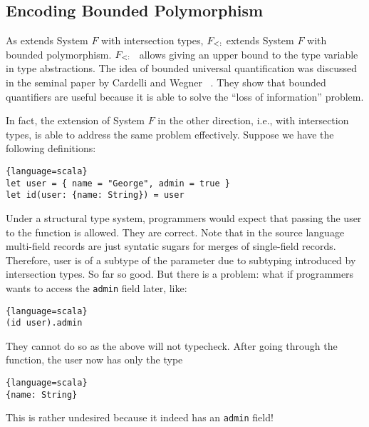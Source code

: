



\subsection{Encoding Bounded Polymorphism}

As \name extends System $ F $ with intersection types, $ F_{<:} $ extends
System $ F $ with bounded polymorphism. $ F_{<:} $~\cite{pierce2002types}
allows giving an upper bound to the type variable in type abstractions. The idea
of bounded universal quantification was discussed in the seminal paper by
Cardelli and Wegner ~\cite{cardelli1985understanding}. They show that bounded
quantifiers are useful because it is able to solve the ``loss of information''
problem.

In fact, the extension of System $ F $ in the other direction, i.e., with
intersection types, is able to address the same problem effectively. Suppose we
have the following definitions:
\begin{lstlisting}{language=scala}
let user = { name = "George", admin = true }
let id(user: {name: String}) = user
\end{lstlisting}
Under a structural type system, programmers would expect that passing the user
to the function is allowed. They are correct. Note that in the source language
multi-field records are just syntatic sugars for merges of single-field records.
Therefore, user is of a subtype of the parameter due to subtyping introduced by
intersection types. So far so good. But there is a problem: what if programmers
wants to access the \texttt{admin} field later, like:
\begin{lstlisting}{language=scala}
(id user).admin
\end{lstlisting}
They cannot do so as the above will not typecheck. After going through the
function, the user now has only the type
\begin{lstlisting}{language=scala}
{name: String}
\end{lstlisting}
This is rather undesired because it indeed has an \texttt{admin} field!

